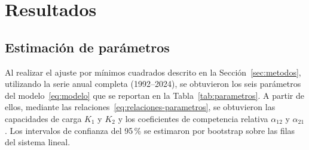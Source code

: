 \documentclass[11pt,a4paper]{article}
\newif\ifguias
\newcommand{\guia}[1]{\ifguias\par\noindent
  {\color{gray!85!black}\small\itshape #1}\par\medskip\fi}
\begin{document}
\section{Resultados}
\label{sec:resultados}

\guia{Sólo hechos: qué dio. La interpretación va en la Discusión.
Cada resultado numérico con su incertidumbre y sus unidades. Cada figura
y cada tabla tiene que estar mencionada en el texto (``la
Figura~\ref{fig:ajuste} muestra\dots''); si una figura no se menciona,
sobra.}

\subsection{Estimación de parámetros}
\label{sec:estim}
Al realizar el ajuste por mínimos cuadrados descrito en la
Sección~\ref{sec:metodos}, utilizando la serie anual completa
(1992--2024), se obtuvieron los seis parámetros del modelo~\eqref{eq:modelo}
que se reportan en la Tabla~\ref{tab:parametros}. A partir de ellos,
mediante las relaciones~\eqref{eq:relaciones-parametros}, se obtuvieron las
capacidades de carga $K_1$ y $K_2$ y los coeficientes de competencia
relativa $\alpha_{12}$ y $\alpha_{21}$. Los intervalos de confianza del
95\,\% se estimaron por bootstrap sobre las filas del sistema lineal.
\end{document}
